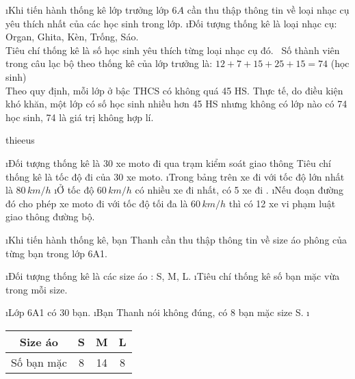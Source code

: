 \begin{Answer}{1}
		\begin{enumerate}[a),leftmargin=*]
			\i Khi tiến hành thống kê lớp trưởng lớp  $6A$ cần thu thập thông tin về loại nhạc cụ yêu thích nhất của các học sinh trong lớp.
			\i Đối tượng thống kê là  loại nhạc cụ: Organ, Ghita, Kèn, Trống, Sáo.\\
			Tiêu chí thống kê là số học sinh yêu thích từng loại nhạc cụ đó.
			\ Số thành viên trong câu lạc bộ theo thống kê của lớp trưởng là: $12 + 7+ 15 +25 +15 = 74$ (học sinh)\\
			Theo quy định, mỗi lớp ở bậc THCS có không quá 45 HS. Thực tế, do điều kiện khó khăn, một lớp có số học sinh nhiều hơn 45 HS nhưng không có lớp nào có 74 học sinh,  74 là giá trị không hợp lí.
		\end{enumerate}
	
\end{Answer}
\begin{Answer}{2}
		thieeus
	
\end{Answer}
\begin{Answer}{3}
		\begin{enumerate}[a),leftmargin=*]
			\i Đối tượng thống kê là  30 xe moto đi qua trạm kiểm soát giao thông
			Tiêu chí thống kê là tốc độ đi của  30 xe moto.
			\i Trong bảng trên xe đi với tốc độ lớn nhất là  $80\, km/h$
			\i Ở tốc độ $60\, km/h$ có nhiều xe đi nhất, có  5 xe đi .
			\i Nếu đoạn đường đó cho phép xe moto đi với tốc độ tối đa là  $60 \,km/h$ thì có 12  xe vi phạm luật giao thông đường bộ.
		\end{enumerate}
	
\end{Answer}
\begin{Answer}{4}
		\begin{enumerate}[a),leftmargin=*]
			\i Khi tiến hành thống kê, bạn Thanh cần thu thập thông tin về size áo phông của từng bạn trong lớp 6A1.
			\begin{enumerate}[+,leftmargin=*]
				\i Đối tượng thống kê là các size áo : S, M, L.
				\i Tiêu chí thống kê số bạn mặc vừa trong mỗi size.
			\end{enumerate}
			\i Lớp 6A1 có 30 bạn.
			\i Bạn Thanh nói không đúng, có 8 bạn mặc size S.
			\i
			\begin{tabular}{|c|c|c|c|}
				\hline
				Size áo &	S&	M&	L\\
				\hline
				Số bạn mặc&	8&	14&	8\\
				\hline
			\end{tabular}
		\end{enumerate}
	
\end{Answer}

